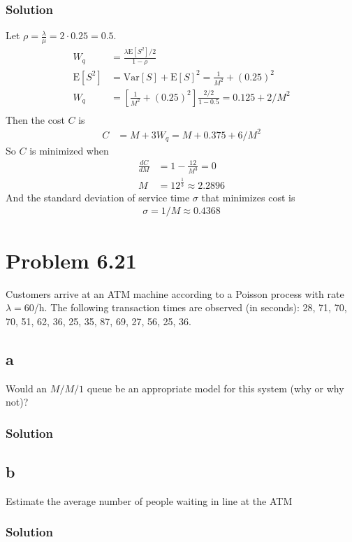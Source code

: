 \documentclass[letterpaper]{amsart}
\begin{document}
\subsubsection*{Solution}
Let $\rho = \frac{\lambda}{\mu}=2\cdot 0.25=0.5$.
\begin{align*}
  W_q&=\frac{\lambda\text{E}[S^2]/2}{1-\rho} \\
  \text{E}[S^2]&=\text{Var}[S]+\text{E}[S]^2 = \frac{1}{M^2} + (0.25)^2 \\
  W_q&=\left[\frac{1}{M^2} + (0.25)^2\right]\frac{2/2}{1-0.5} = 0.125 + 2/M^2\\
\end{align*}
Then the cost $C$ is
\begin{align*}
  C &= M + 3W_q= M + 0.375 + 6/M^2
\end{align*}
So $C$ is minimized when
\begin{align*}
  \frac{dC}{dM} &= 1 - \frac{12}{M^3}=0\\
  M&=12^{\frac{1}{3}} \approx 2.2896
\end{align*}
And the standard deviation of service time $\sigma$ that minimizes cost is
\begin{align*}
\sigma=1/M\approx 0.4368
\end{align*}


\section{Problem 6.21} %
Customers arrive at an ATM machine according to a Poisson process with
rate $\lambda= 60$/h. The following transaction times are observed (in seconds):
28, 71, 70, 70, 51, 62, 36, 25, 35, 87, 69, 27, 56, 25, 36.
\subsection*{a}
Would an $M/M/1$ queue be an appropriate model for this system (why
or why not)?
\subsubsection*{Solution}
\subsection*{b}
Estimate the average number of people waiting in line at the ATM
\subsubsection*{Solution}
\end{document}
